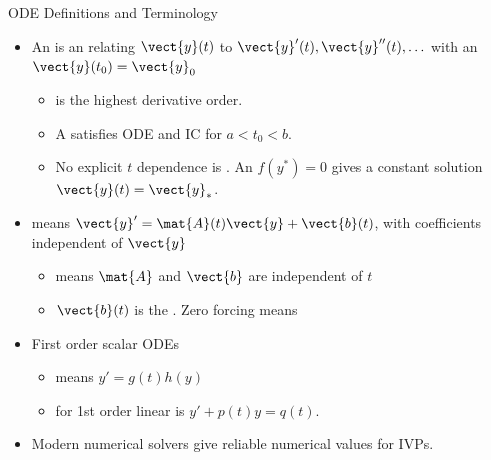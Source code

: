 \begin{frame}{ODE Definitions and Terminology}
\begin{itemize}
  \item An  is an  relating $\vect{y}(t)$ to $\vect{y}'(t),\vect{y}''(t),\ldots$ with an  $\vect{y}(t_0)=\vect{y}_0$
  \begin{itemize}
    \item {} is the highest derivative order. \item A  satisfies ODE and IC for $a<t_0<b$.
    \item No explicit $t$ dependence is . An  
    $f(y^*)=0$ gives a constant solution $\vect{y}(t)=\vect{y}_*$.
  \end{itemize}
  \item {} means $\vect{y}'=\mat{A}(t)\vect{y}+\vect{b}(t)$, with coefficients independent of $\vect{y}$
  \begin{itemize}
    \item {} means $\mat{A}$ and $\vect{b}$ are independent of $t$
    \item $\vect{b}(t)$ is the . Zero forcing means 
  \end{itemize}
  \item First order scalar ODEs
  \begin{itemize}
    \item {} means $y'=g(t)h(y)$
    \item {} for 1st order linear is  $y'+p(t)y=q(t)$.
    \end{itemize}
    \item Modern numerical solvers give reliable numerical values for IVPs.  
\end{itemize}
\end{frame}
